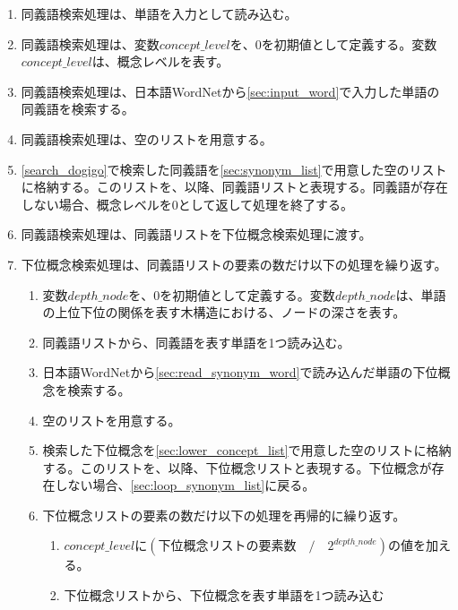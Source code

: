 \begin{enumerate}
    \item 同義語検索処理は、単語を入力として読み込む。
    \label{sec:input_word}
    \item 同義語検索処理は、変数$concept\_level$を、0を初期値として定義する。変数$concept\_level$は、概念レベルを表す。
    \item 同義語検索処理は、日本語WordNetから\ref{sec:input_word}で入力した単語の同義語を検索する。
    \label{search_dogigo}
    \item 同義語検索処理は、空のリストを用意する。
    \label{sec:synonym_list}
    \item \ref{search_dogigo}で検索した同義語を\ref{sec:synonym_list}で用意した空のリストに格納する。このリストを、以降、同義語リストと表現する。同義語が存在しない場合、概念レベルを0として返して処理を終了する。
    \item 同義語検索処理は、同義語リストを下位概念検索処理に渡す。
    \item 下位概念検索処理は、同義語リストの要素の数だけ以下の処理を繰り返す。
        \begin{enumerate}
            \item 変数$depth\_node$を、0を初期値として定義する。変数$depth\_node$は、単語の上位下位の関係を表す木構造における、ノードの深さを表す。
            \label{sec:loop_synonym_list}
            \item 同義語リストから、同義語を表す単語を1つ読み込む。
            \label{sec:read_synonym_word}
            \item 日本語WordNetから\ref{sec:read_synonym_word}で読み込んだ単語の下位概念を検索する。
            \item 空のリストを用意する。
            \label{sec:lower_concept_list}
            \item 検索した下位概念を\ref{sec:lower_concept_list}で用意した空のリストに格納する。このリストを、以降、下位概念リストと表現する。下位概念が存在しない場合、\ref{sec:loop_synonym_list}に戻る。
            \item 下位概念リストの要素の数だけ以下の処理を再帰的に繰り返す。
            \label{reloop}
                \begin{enumerate}
                    \item $concept\_level$に$(下位概念リストの要素数\quad/\quad2^{depth\_node})$の値を加える。
                    \label{sec:loop_lower_list}
                    \item 下位概念リストから、下位概念を表す単語を1つ読み込む
                    \label{sec:read_lower_word}

\end{enumerate}
\end{enumerate}
\end{enumerate}
